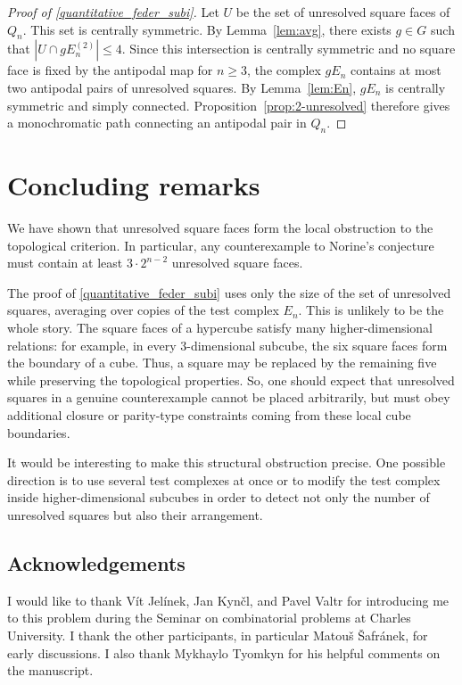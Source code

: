 \documentclass[12pt,UKenglish]{amsart}
\theoremstyle{plain}
\theoremstyle{definition}
\theoremstyle{remark}
\begin{document}
\begin{proof}[Proof of \cref{quantitative_feder_subi}]
Let \(U\) be the set of unresolved square faces of \(Q_n\). This set is centrally symmetric. By Lemma~\ref{lem:avg}, there exists \(g\in G\) such that
\(
|U\cap gE_n^{(2)}|\le 4.\) Since this intersection is centrally symmetric and no square face is fixed by the antipodal map for \(n\ge3\), the complex \(gE_n\) contains at most two antipodal pairs of unresolved squares. By Lemma~\ref{lem:En}, \(gE_n\) is centrally symmetric and simply connected. Proposition~\ref{prop:2-unresolved} therefore gives a monochromatic path connecting an antipodal pair in \(Q_n\).
\end{proof}

\section{Concluding remarks}\label{sec:remarks}

We have shown that unresolved square faces form the local obstruction to the
topological criterion. In particular, any counterexample to Norine's conjecture
must contain at least \(3\cdot 2^{n-2}\) unresolved square faces.

The proof of \cref{quantitative_feder_subi} uses only the size of the set of
unresolved squares, averaging over copies of the test complex \(E_n\).
This is unlikely to be the whole story. The square faces of a hypercube satisfy
many higher-dimensional relations: for example, in every \(3\)-dimensional
subcube, the six square faces form the boundary of a cube. Thus, a square may be replaced by the remaining five while preserving the topological properties. So, one  should expect
that unresolved squares in a genuine counterexample cannot be placed
arbitrarily, but must obey additional closure or parity-type constraints coming
from these local cube boundaries.

It would be interesting to make this structural obstruction precise. One
possible direction is to use several test complexes at once or to modify the
test complex inside higher-dimensional subcubes in order to detect not only
the number of unresolved squares but also their arrangement.

\subsection*{Acknowledgements}
I would like to thank V\'it Jel\'inek, Jan Kyn\v{c}l, and Pavel Valtr for introducing me to this problem during the Seminar on combinatorial problems at Charles University. I thank the other participants, in particular Matou\v{s} \v{S}afr\'anek, for early discussions. I also thank Mykhaylo Tyomkyn for his helpful comments on the manuscript.
 	
	
\end{document}
